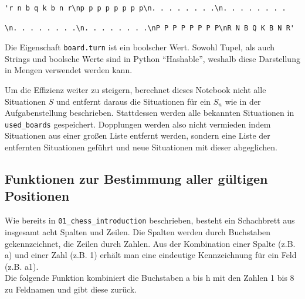 \documentclass[a4paper,12pt]{article}
\begin{document}
\begin{verbatim}
'r n b q k b n r\np p p p p p p p\n. . . . . . . .\n. . . . . . . . 
\end{verbatim}
\begin{verbatim}
\n. . . . . . . .\n. . . . . . . .\nP P P P P P P P\nR N B Q K B N R'
\end{verbatim}

Die Eigenschaft \texttt{board.turn} ist ein boolscher Wert. Sowohl
Tupel, als auch Strings und boolsche Werte sind in Python ``Hashable'',
weshalb diese Darstellung in Mengen verwendet werden kann.

Um die Effizienz weiter zu steigern, berechnet dieses Notebook nicht
alle Situationen \(S\) und entfernt daraus die Situationen für ein
\(S_n\) wie in der Aufgabenstellung beschrieben. Stattdessen werden alle
bekannten Situationen in \texttt{used\_boards} gespeichert. Dopplungen
werden also nicht vermieden indem Situationen aus einer großen Liste
entfernt werden, sondern eine Liste der entfernten Situationen geführt
und neue Situationen mit dieser abgeglichen.

    \hypertarget{funktionen-zur-bestimmung-aller-guxfcltigen-positionen}{%
\subsection{Funktionen zur Bestimmung aller gültigen
Positionen}\label{funktionen-zur-bestimmung-aller-guxfcltigen-positionen}}

Wie bereits in \texttt{01\_chess\_introduction} beschrieben, besteht ein
Schachbrett aus insgesamt acht Spalten und Zeilen. Die Spalten werden
durch Buchstaben gekennzeichnet, die Zeilen durch Zahlen. Aus der
Kombination einer Spalte (z.B. a) und einer Zahl (z.B. 1) erhält man
eine eindeutige Kennzeichnung für ein Feld (z.B. a1).\\
Die folgende Funktion kombiniert die Buchstaben a bis h mit den Zahlen 1
bis 8 zu Feldnamen und gibt diese zurück.
\end{document}
